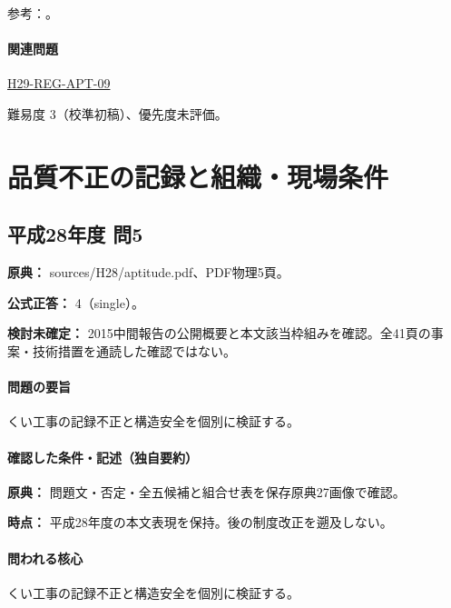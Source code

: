 \par 参考：\cite{saf53_products2012,saf53_productflow2013,saf53_products2023}。

\paragraph{関連問題} \hyperref[q:h29-reg-apt-09]{H29-REG-APT-09}

\par 難易度 3（校準初稿）、優先度未評価。

\section{品質不正の記録と組織・現場条件}

\subsection{平成28年度 問5}
\label{q:h28-reg-apt-05}

\noindent\textbf{原典：} sources/H28/aptitude.pdf、PDF物理5頁。

\textbf{公式正答：} 4（single）。

\par\textbf{検討未確定：} 2015中間報告の公開概要と本文該当枠組みを確認。全41頁の事案・技術措置を通読した確認ではない。

\paragraph{問題の要旨} くい工事の記録不正と構造安全を個別に検証する。

\paragraph{確認した条件・記述（独自要約）}\mbox{}\par

\noindent\textbf{原典：} 問題文・否定・全五候補と組合せ表を保存原典27画像で確認。\par

\noindent\textbf{時点：} 平成28年度の本文表現を保持。後の制度改正を遡及しない。\par

\paragraph{問われる核心} くい工事の記録不正と構造安全を個別に検証する。

